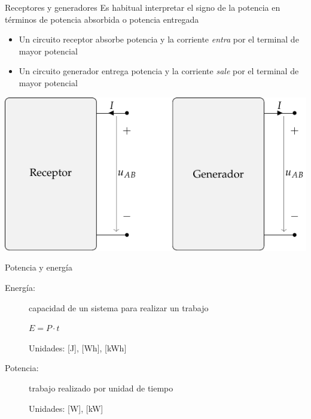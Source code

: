 \documentclass[aspectratio=169, xcolor={usenames,svgnames,dvipsnames}]{beamer}
\begin{document}

\begin{frame}{Receptores y generadores}
    Es habitual \alert{interpretar} el signo de la potencia en términos de potencia absorbida o potencia entregada 
    \begin{itemize}
        \item Un \alert{circuito receptor absorbe potencia} y la corriente \emph{entra} por el terminal de mayor potencial
        \item Un \alert{circuito generador entrega potencia} y la corriente \emph{sale} por el terminal de mayor potencial
    \end{itemize}
    
    \begin{center}
        \includegraphics[height=0.5\textheight]{../figs/receptor_generador.pdf}
    \end{center}
\end{frame}


\begin{frame}{Potencia y energía}
    \begin{description}    
        \item[{Energía}:] capacidad de un sistema para realizar un trabajo 
        
        \vspace{2mm}
        $E=P\cdot t$
        
        \vspace{2mm}
        Unidades: [J], [Wh], [kWh]
        
        
        \vspace{5mm}
        
        \item[{Potencia}:] trabajo realizado por unidad de tiempo

        \vspace{2mm}
        
        Unidades: [W], [kW]
    \end{description}
\end{frame}
\end{document}
